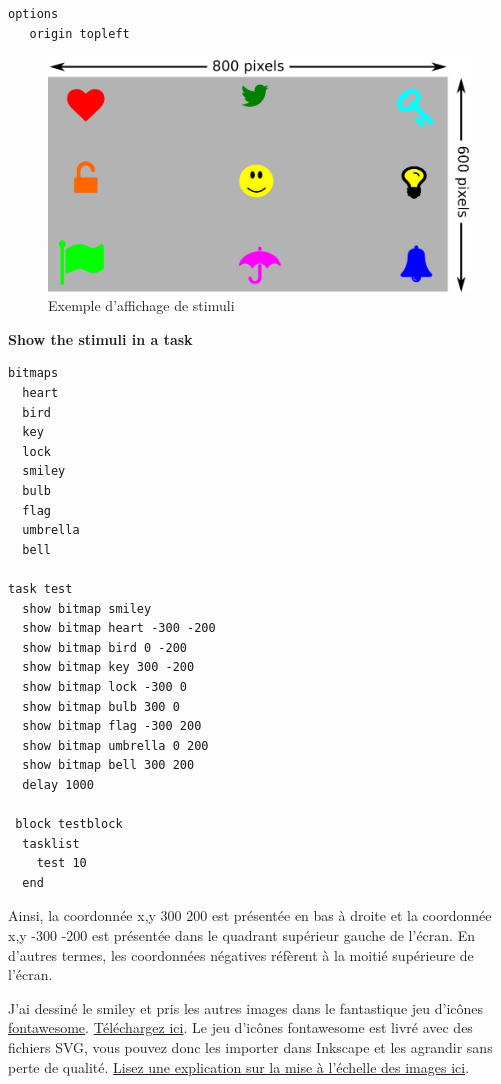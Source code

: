 \documentclass[
]{book}
\begin{document}
\begin{verbatim}
options
   origin topleft
\end{verbatim}

\begin{figure}
\centering
\includegraphics{img/coordinates.png}
\caption{Exemple d'affichage de stimuli}
\end{figure}

\textbf{Show the stimuli in a task}

\begin{verbatim}
bitmaps
  heart
  bird
  key
  lock
  smiley
  bulb
  flag
  umbrella
  bell

task test
  show bitmap smiley
  show bitmap heart -300 -200
  show bitmap bird 0 -200
  show bitmap key 300 -200
  show bitmap lock -300 0
  show bitmap bulb 300 0
  show bitmap flag -300 200
  show bitmap umbrella 0 200
  show bitmap bell 300 200
  delay 1000

 block testblock
  tasklist
    test 10
  end
\end{verbatim}

Ainsi, la coordonnée x,y 300 200 est présentée en bas à droite et la
coordonnée x,y -300 -200 est présentée dans le quadrant supérieur gauche
de l'écran. En d'autres termes, les coordonnées négatives réfèrent à la
moitié supérieure de l'écran.

J'ai dessiné le smiley et pris les autres images dans le fantastique jeu
d'icônes \href{https://en.wikipedia.org/wiki/Font_Awesome}{fontawesome}.
\href{http://fontawesome.io/}{Téléchargez ici}. Le jeu d'icônes
fontawesome est livré avec des fichiers SVG, vous pouvez donc les
importer dans Inkscape et les agrandir sans perte de qualité.
\href{http://www.hiland.com/knowledge-base/bitmap-and-vector-images-understanding-the-difference/}{Lisez
une explication sur la mise à l'échelle des images ici}.
\end{document}

